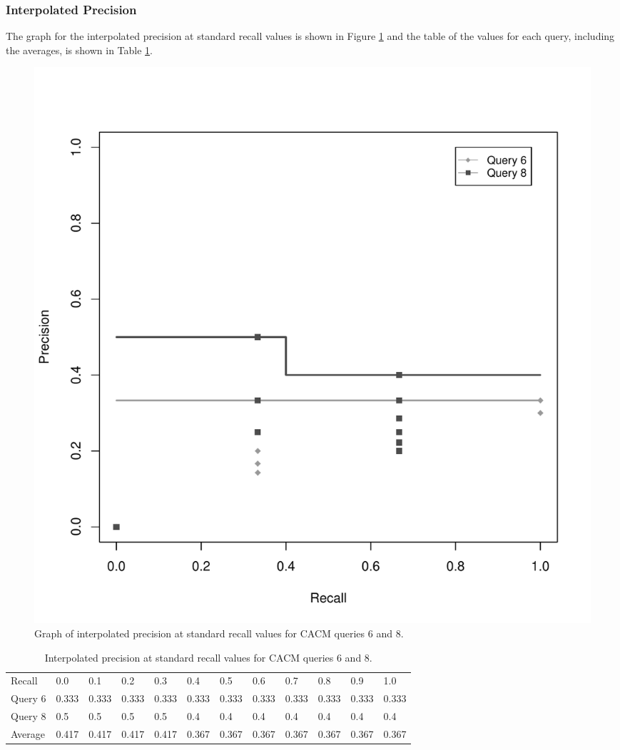 \subsubsection{Interpolated Precision}
The graph for the interpolated precision at standard recall values is shown in Figure \ref{fig:iprgraph68} and the table of the values for each query, including the averages, is shown in Table \ref{tab:ipr68}.

\begin{figure}[H]
\centering
\label{fig:iprgraph68}
\includegraphics[scale=.6]{code/getrel/ipr68.pdf}
\caption{Graph of interpolated precision at standard recall values for CACM queries 6 and 8.}
\end{figure}

\begin{table}[H]
\centering
\begin{tabular}{ l l l l l l l l l l l l }
Recall & 0.0 & 0.1 & 0.2 & 0.3 & 0.4 & 0.5 & 0.6 & 0.7 & 0.8 & 0.9 & 1.0 \\
\cline{2-12}
Query 6 & 0.333 & 0.333 & 0.333 & 0.333 & 0.333 & 0.333 & 0.333 & 0.333 & 0.333 & 0.333 & 0.333 \\
\cline{2-12}
Query 8 & 0.5 & 0.5 & 0.5 & 0.5 & 0.4 & 0.4 & 0.4 & 0.4 & 0.4 & 0.4 & 0.4 \\
\cline{2-12}
Average & 0.417 & 0.417 & 0.417 & 0.417 & 0.367 & 0.367 & 0.367 & 0.367 & 0.367 & 0.367 & 0.367 \\
\cline{2-12}
\end{tabular}
\caption{Interpolated precision at standard recall values for CACM queries 6 and 8.}
\label{tab:ipr68}
\end{table}

